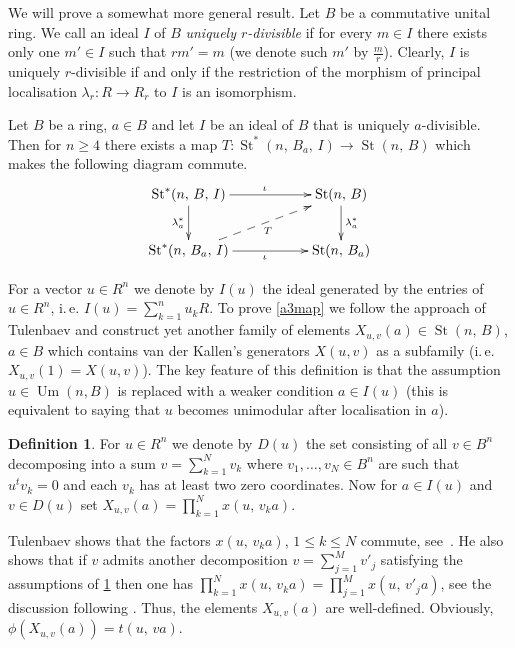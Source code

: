 \documentclass[11pt]{amsart}
\theoremstyle{plain} \declaretheorem[name=Theorem, Refname={Theorem,Theorems}]{tm} \Crefname{tm}{Theorem}{Theorems}
\numberwithin{equation}{section}
\theoremstyle{definition} \newtheorem{df}[lm]{Definition} \Crefname{df}{Definition}{Definitions}
\theoremstyle{remark} \newtheorem{rk}[lm]{Remark} \Crefname{rk}{Remark}{Remarks}
\newcommand{\E}{{\mathrm{E}}}
\newcommand{\Um}{\mathop{\mathrm{Um}}\nolimits}
\newcommand{\St}{\mathop{\mathrm{St}}\nolimits}
\begin{document}
We will prove a somewhat more general result. Let $B$ be a commutative unital ring.
We call an ideal $I$ of $B$ \emph{uniquely $r$-divisible} if for every $m\in I$ there exists only one $m'\in I$ such that $rm' = m$ (we denote such $m'$ by $\frac{m}{r}$).
Clearly, $I$ is uniquely $r$-divisible if and only if the restriction of the morphism of principal localisation $\lambda_r\colon R \to R_r$ to $I$ is an isomorphism.

\begin{tm} \label{a3map} Let $B$ be a ring, $a\in B$ and let $I$ be an ideal of $B$ that is uniquely $a$-divisible.
Then for $n\geq 4$ there exists a map $T\colon\St^*(n,\,B_a,\,I)\rightarrow\St(n,\,B)$ which makes the following diagram commute.
\begin{equation} \xymatrix{ \St^*(n,\,B,\,I)\ar@<-0.0ex>[rr]^{\iota}\ar@<-0.0ex>[d]_{\lambda_{a}^*} && \St(n,\,B)\ar@<-0.0ex>[d]^{\lambda_{a}^*}\\
                            \St^*(n,\,B_a,\,I)\ar@<-0.0ex>[rr]_{\iota}\ar@{-->}[rru]_{T}            && \St(n,\,B_a)} \label{eq:a3diag} \end{equation} \end{tm}

For a vector $u\in R^n$ we denote by $I(u)$ the ideal generated by the entries of $u\in R^n$, i.\,e. $I(u)=\sum\limits_{k=1}^nu_kR$.
To prove \cref{a3map} we follow the approach of Tulenbaev and construct yet another family of elements $X_{u,v}(a)\in \St(n,\,B)$, $a\in B$ which contains van der Kallen's generators $X(u, v)$ as a subfamily (i.\,e. $X_{u,v}(1) = X(u, v)$).
The key feature of this definition is that the assumption $u \in\Um(n, B)$ is replaced with a weaker condition $a \in I(u)$ (this is equivalent to saying that $u$ becomes unimodular after localisation in $a$).

\setcounter{df}{1}
\begin{df} \label{df:TulX}
For $u \in R^n$ we denote by $D(u)$ the set consisting of all $v\in B^n$ decomposing into a sum $v=\sum_{k=1}^Nv_k$ where $v_1,\ldots,v_N\in B^n$ are such that $u^tv_k=0$ and each $v_k$ has at least two zero coordinates.
Now for $a\in I(u)$ and $v \in D(u)$ set $X_{u,v}(a) = \prod\limits_{k=1}^Nx(u,\,v_ka)$.
\end{df}
Tulenbaev shows that the factors $x(u,\,v_ka)$, $1\leq k\leq N$ commute, see~\cite[Lemma~1.1\,e)]{Tul}.
He also shows that if $v$ admits another decomposition $v=\sum_{j=1}^Mv'_j$ satisfying the assumptions of \cref{df:TulX} then one has
$\prod_{k=1}^Nx(u,\,v_ka)=\prod_{j=1}^Mx(u,\,v'_ja)$, see the discussion following \cite[Lemma~1.1]{Tul}.
Thus, the elements $X_{u,v}(a)$ are well-defined. Obviously, $\phi(X_{u,v}(a))=t(u,\,va)$.
\end{document}
